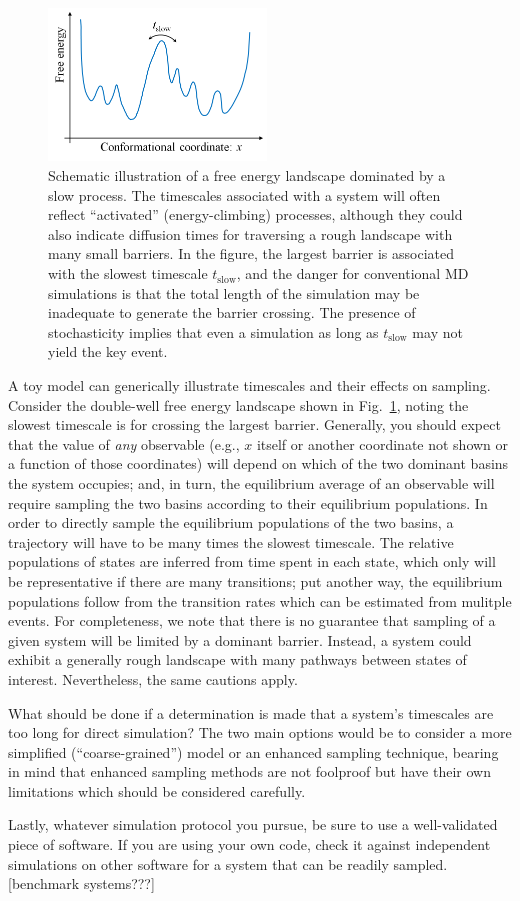 \begin{figure}
  \centering
  \includegraphics[width=5.8cm]{figures/1d-landscape-tslow}
  \caption{
  \label{fig:landscape} 
  Schematic illustration of a free energy landscape dominated by a slow process.
  The timescales associated with a system will often reflect ``activated'' (energy-climbing) processes, although they could also indicate diffusion times for traversing a rough landscape with many small barriers.
  In the figure, the largest barrier is associated with the slowest timescale $t_{\mathrm{slow}}$, and the danger for conventional MD simulations is that the total length of the simulation may be inadequate to generate the barrier crossing.
  The presence of stochasticity implies that even a simulation as long as $t_{\mathrm{slow}}$ may not yield the key event.
  }
\end{figure}

A toy model can generically illustrate timescales and their effects on sampling.
Consider the double-well free energy landscape shown in Fig.\ \ref{fig:landscape}, noting the slowest timescale is for crossing the largest barrier.
Generally, you should expect that the value of \emph{any} observable (e.g., $x$ itself or another coordinate not shown or a function of those coordinates) will depend on which of the two dominant basins the system occupies; and, in turn, the equilibrium average of an observable will require sampling the two basins according to their equilibrium populations.
In order to directly sample the equilibrium populations of the two basins, a trajectory will have to be many times the slowest timescale.
The relative populations of states are inferred from time spent in each state, which only will be representative if there are many transitions;
put another way, the equilibrium populations follow from the transition rates \cite{Zuckerman2011} which can be estimated from mulitple events.
For completeness, we note that there is no guarantee that sampling of a given system will be limited by a dominant barrier.  
Instead, a system could exhibit a generally rough landscape with many pathways between states of interest.
Nevertheless, the same cautions apply.

What should be done if a determination is made that a system's timescales are too long for direct simulation?
The two main options would be to consider a more simplified (``coarse-grained'') model or an enhanced sampling technique, bearing in mind that enhanced sampling methods are not foolproof but have their own limitations which should be considered carefully.

Lastly, whatever simulation protocol you pursue, be sure to use a well-validated piece of software.
If you are using your own code, check it against independent simulations on other software for a system that can be readily sampled.
[benchmark systems???]


